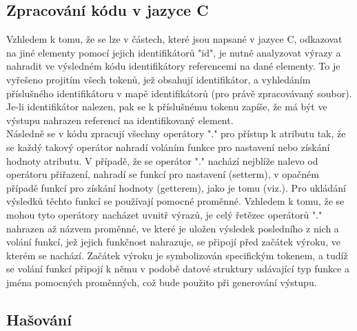 \documentclass[report,11pt]{elsarticle}
\begin{document}
\subsection{Zpracování kódu v jazyce C}
Vzhledem k tomu, že se lze v částech, které jsou napsané v jazyce C, odkazovat na jiné elementy pomocí jejich identifikátorů "id", je nutné analyzovat výrazy a nahradit ve výsledném kódu identifikátory referencemi na dané elementy. To je vyřešeno projitím všech tokenů, jež obsahují identifikátor, a vyhledáním příslušného identifikátoru v mapě identifikátorů (pro právě zpracovávaný soubor). Je-li identifikátor nalezen, pak se k příslušnému tokenu zapíše, že má být ve výstupu nahrazen referencí na identifikovaný element.\\
Následně se v kódu zpracují všechny operátory "." pro přístup k atributu tak, že se každý takový operátor nahradí voláním funkce pro nastavení nebo získání hodnoty atributu. V případě, že se operátor "." nachází nejblíže nalevo od operátoru přiřazení, nahradí se funkcí pro nastavení (setterm), v opačném případě funkcí pro získání hodnoty (getterem), jako je tomu (viz.). Pro ukládání výsledků těchto funkcí se používají pomocné proměnné. Vzhledem k tomu, že se mohou tyto operátory nacházet uvnitř výrazů, je celý řetězec operátorů "." nahrazen až názvem proměnné, ve které je uložen výsledek posledního z nich a volání funkcí, jež jejich funkčnost nahrazuje, se připojí před začátek výroku, ve kterém se nachází. Začátek výroku je symbolizován specifickým tokenem, a tudíž se volání funkcí připojí k němu v podobě datové struktury udávající typ funkce a jména pomocných proměnných, což bude použito při generování výstupu.

\subsection {Hašování}
\end{document}
